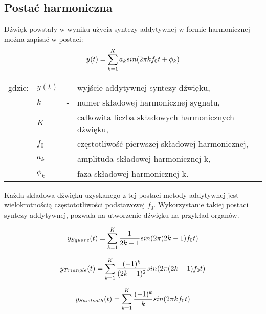 \subsection{Postać harmoniczna} \label{pos_harm}
Dźwięk powstały w wyniku użycia syntezy addytywnej w formie harmonicznej można zapisać w postaci:
\begin{equation} \label{equ:addit_time_harm}
y(t) = \sum_{k=1}^{K} a_{k}sin(2\pi kf_{0}t + \phi_{k})  \\  
\end{equation}
\begin{tabular}{ l l l l}
	gdzie: & $y(t)$ &  - & wyjście addytywnej syntezy dźwięku, \\
	&	$k$ & - &  numer składowej harmonicznej sygnału, \\
	&	$K$ & - &  całkowita liczba składowych harmonicznych dźwięku,\\
	&	$f_{0}$ & - &  częstotliwość pierwszej składowej harmonicznej,\\
	&	$a_{k}$ & - &  amplituda składowej harmonicznej k, \\
	&	$\phi_{k}$ & - &  faza składowej harmonicznej k. \\
\end{tabular}

Każda składowa dźwięku uzyskanego z tej postaci metody addytywnej jest wielokrotnością częstototliwości podstawowej $f_{0}$. Wykorzystanie takiej postaci syntezy addytywnej, pozwala na utworzenie dźwięku na przykład organów.


\begin{equation} \label{equ:addit_sqr}
y_{Square}(t) = \sum_{k=1}^{K} \frac{1}{2k-1} sin(2\pi (2k-1)f_{0}t) \\
\end{equation}

\begin{equation} \label{equ:addit_trng}
y_{Triangle}(t) = \sum_{k=1}^{K} \frac{(-1)^k}{(2k-1)^2} sin(2\pi (2k-1)f_{0}t)  \\
\end{equation}

\begin{equation} \label{equ:addit_sawth}
y_{Sawtooth}(t) = \sum_{k=1}^{K} \frac{(-1)^k}{k} sin(2\pi kf_{0}t) \\
\end{equation}

